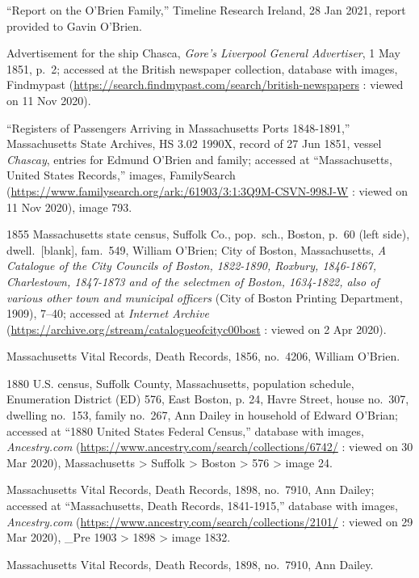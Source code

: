 \begin{thebibliography}{999}
``Report on the O'Brien Family,'' Timeline Research Ireland, 28 Jan 2021, report provided to Gavin O'Brien.

Advertisement for the ship Chasca, \textit{Gore's Liverpool General Advertiser}, 1 May 1851, p.\ 2; accessed at the British newspaper collection, database with images, Findmypast (\url{https://search.findmypast.com/search/british-newspapers} : viewed on 11 Nov 2020).

``Registers of Passengers Arriving in Massachusetts Ports 1848-1891,'' Massachusetts State Archives, HS 3.02 1990X, record of 27 Jun 1851, vessel \textit{Chascay}, entries for Edmund O'Brien and family; accessed at ``Massachusetts, United States Records,'' images, FamilySearch (\url{https://www.familysearch.org/ark:/61903/3:1:3Q9M-CSVN-998J-W} : viewed on 11 Nov 2020), image 793.

1855 Massachusetts state census, Suffolk Co., pop.\ sch., Boston, p.\ 60 (left side), dwell.\ [blank], fam.\ 549,  William O'Brien; City of Boston, Massachusetts, \textit{A Catalogue of the City Councils of Boston, 1822-1890, Roxbury, 1846-1867, Charlestown, 1847-1873 and of the selectmen of Boston, 1634-1822, also of various other town and municipal officers} (City of Boston Printing Department, 1909), 7--40; accessed at \textit{Internet Archive} (\url{https://archive.org/stream/catalogueofcityc00bost} : viewed on 2 Apr 2020).

Massachusetts Vital Records, Death Records, 1856, no.\ 4206, William O'Brien.

1880 U.S. census, Suffolk County, Massachusetts, population schedule, Enumeration District (ED) 576, East Boston, p. 24, Havre Street, house no.\ 307, dwelling no.\ 153, family no.\ 267, Ann Dailey in household of Edward O'Brian; accessed at ``1880 United States Federal Census,'' database with images, \textit{Ancestry.com} (\url{https://www.ancestry.com/search/collections/6742/} : viewed on 30 Mar 2020), Massachusetts > Suffolk > Boston > 576 > image 24.

Massachusetts Vital Records, Death Records, 1898, no.\ 7910, Ann Dailey; accessed at ``Massachusetts, Death Records, 1841-1915,'' database with images, \textit{Ancestry.com} (\url{https://www.ancestry.com/search/collections/2101/} : viewed on 29 Mar 2020), \_Pre 1903 > 1898 > image 1832.

Massachusetts Vital Records, Death Records, 1898, no.\ 7910, Ann Dailey.

\end{thebibliography}